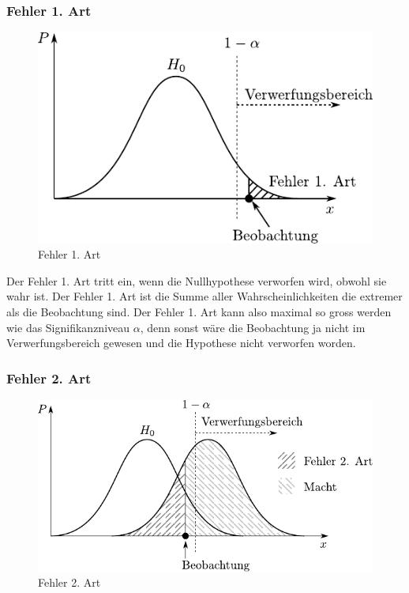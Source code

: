 \subsubsection{Fehler 1. Art}

\begin{figure}
        \centering
        \includegraphics[scale=\graphscale]{fehler-erster-art.pdf}
        \caption{Fehler 1. Art}
\end{figure}

Der Fehler 1. Art tritt ein, wenn die Nullhypothese verworfen wird, 
obwohl sie wahr ist. Der Fehler 1. Art ist die Summe aller
Wahrscheinlichkeiten die extremer als die Beobachtung sind.
Der Fehler 1. Art kann also maximal so gross werden wie das
Signifikanzniveau $\alpha$, denn sonst wäre die Beobachtung ja
nicht im Verwerfungsbereich gewesen und die Hypothese nicht 
verworfen worden.

\subsubsection{Fehler 2. Art}
\begin{figure}
        \centering
        \includegraphics[scale=\graphscale]{fehler-zweiter-art.pdf}
        \caption{Fehler 2. Art}
\end{figure}

